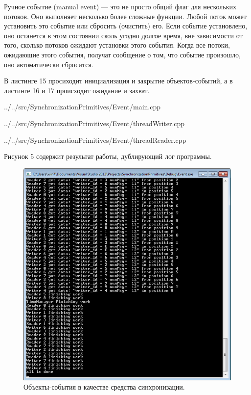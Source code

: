 \documentclass[a4paper, 12pt]{article}		%
\begin{document}
Ручное событие (manual event) — это не просто общий флаг для нескольких потоков. Оно выполняет несколько более сложные функции. Любой поток может установить это событие или сбросить (очистить) его. Если событие установлено, оно останется в этом состоянии сколь угодно долгое время, вне зависимости от того, сколько потоков ожидают установки этого события. Когда все потоки, ожидающие этого события, получат сообщение о том, что событие произошло, оно автоматически сбросится.

В листинге 15 просиходит инициализация и закрытие объектов-событий, а в листинге 16 и 17 происходит ожидание и захват.


{../../src/SynchronizationPrimitives/Event/main.cpp}


{../../src/SynchronizationPrimitives/Event/threadWriter.cpp}


{../../src/SynchronizationPrimitives/Event/threadReader.cpp}

Рисунок 5 содержит результат работы, дублирующий лог программы.

\begin{figure}[h!]
\centering
\includegraphics[scale=1]{res/004}
\caption{Объекты-события в качестве средства синхронизации.}
\end{figure}
\end{document}
